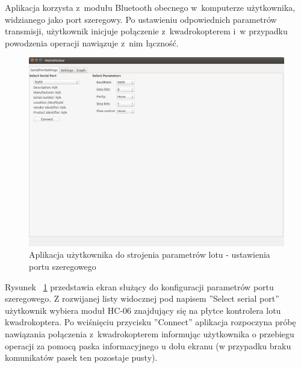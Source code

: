 Aplikacja korzysta z~modułu Bluetooth obecnego w~komputerze użytkownika, widzianego jako port szeregowy. Po ustawieniu odpowiednich parametrów transmisji, użytkownik inicjuje połączenie z~kwadrokopterem i~w przypadku powodzenia operacji nawiązuje z~nim łączność. 

\begin{figure}[H]
	\centering
	\includegraphics[scale=0.4]{Pictures/QuadroTune/QuadroTuneSerialSettings.png}
	\caption[Aplikacja użytkownika do strojenia parametrów lotu - ustawienia portu szeregowego]{Aplikacja użytkownika do strojenia parametrów lotu - ustawienia portu szeregowego}
	\label{fig:QuadroTune_screen1}
\end{figure}

Rysunek ~\ref{fig:QuadroTune_screen1} przedstawia ekran służący do konfiguracji parametrów portu szeregowego. Z rozwijanej listy widocznej pod napisem ''Select serial port'' użytkownik wybiera moduł HC-06 znajdujący się na płytce kontrolera lotu kwadrokoptera. Po wciśnięciu przycisku ''Connect'' aplikacja rozpoczyna próbę nawiązania połączenia z~kwadrokopterem informując użytkownika o przebiegu operacji za pomocą paska informacyjnego u dołu ekranu (w przypadku braku komunikatów pasek ten pozostaje pusty).

